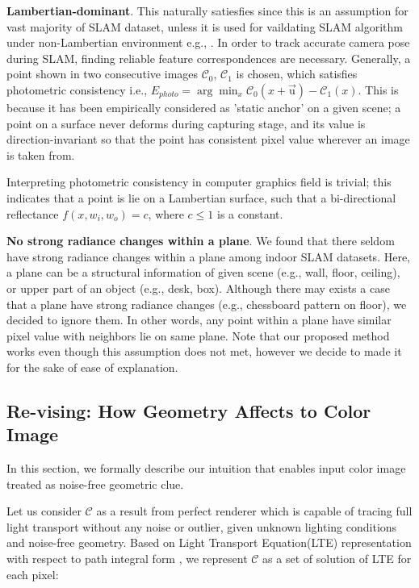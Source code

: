 \noindent \textbf{Lambertian-dominant}. 
This naturally satiesfies since this is an assumption for vast majority of SLAM dataset, unless it is used for vaildating SLAM algorithm under non-Lambertian environment e.g., . 
In order to track accurate camera pose during SLAM, finding reliable feature correspondences are necessary.
Generally, a point shown in two consecutive images $\mathcal{C}_0$, $\mathcal{C}_1$ is chosen, which satisfies photometric consistency i.e., $E_{photo}=\arg\min_x \mathcal{C}_0\left(x+\overrightarrow{\mathrm{u}}\right)-\mathcal{C}_1\left(x\right)$. 
This is because it has been empirically considered as 'static anchor' on a given scene; a point on a surface never deforms during capturing stage, and its value is direction-invariant so that the point has consistent pixel value wherever an image is taken from. 

Interpreting photometric consistency in computer graphics field is trivial; this indicates that a point is lie on a Lambertian surface, such that a bi-directional reflectance $f(x, w_i, w_o)=c$, where $c\le 1$ is a constant.


\noindent \textbf{No strong radiance changes within a plane}. 
We found that there seldom have strong radiance changes within a plane among indoor SLAM datasets. 
Here, a plane can be a structural information of given scene (e.g., wall, floor, ceiling), or upper part of an object (e.g., desk, box).
Although there may exists a case that a plane have strong radiance changes (e.g., chessboard pattern on floor), we decided to ignore them. 
In other words, any point within a plane have similar pixel value with neighbors lie on same plane. 
Note that our proposed method works even though this assumption does not met, however we decide to made it for the sake of ease of explanation.


\subsection{Re-vising: How Geometry Affects to Color Image}
In this section, we formally describe our intuition that enables input color image treated as noise-free geometric clue.

Let us consider $\mathcal{C}$ as a result from perfect renderer which is capable of tracing full light transport without any noise or outlier, given unknown lighting conditions and noise-free geometry. 
Based on Light Transport Equation(LTE) representation with respect to path integral form \cite{veach1998robust}, we represent $\mathcal{C}$ as a set of solution of LTE for each pixel:

